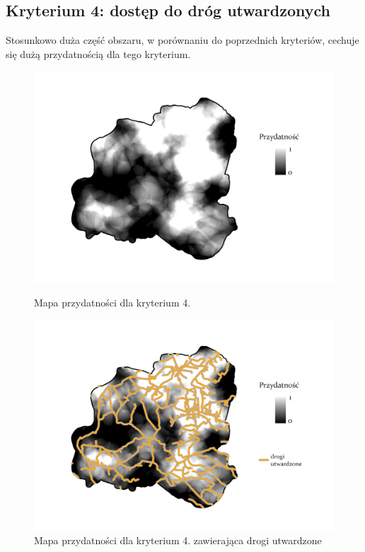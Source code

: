 \documentclass{article}
\begin{document}
\subsection{Kryterium 4: dostęp do dróg utwardzonych}
Stosunkowo duża część obszaru, w porównaniu do poprzednich kryteriów, cechuje się dużą przydatnością dla tego kryterium.

\begin{figure}[H]
    \begin{minipage}[t]{0.48\textwidth}
        \centering
        \includegraphics[width=\linewidth]{img/plesna-kryterium4-layout.jpg}
        \caption{Mapa przydatności dla kryterium 4.}
        \label{fig:kryterium4-layout}
    \end{minipage}
    \hfill
    \begin{minipage}[t]{0.48\textwidth}
        \centering
        \includegraphics[width=\linewidth]{img/plesna-kryterium4-drogi.jpg}
        \caption{Mapa przydatności dla kryterium 4. zawierająca drogi utwardzone}
        \label{fig:kryterium4-drogi}
    \end{minipage}
\end{figure}
\end{document}
